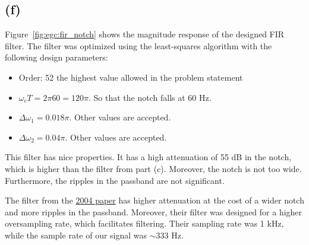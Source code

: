 \documentclass{article}
\begin{document}
\subsection{(f)}

Figure~\ref{fig:egc:fir_notch} shows the magnitude response of the designed FIR filter. The filter was optimized using the least-squares algorithm with the following design parameters:
\begin{itemize}
	\item Order: 52 the highest value allowed in the problem statement
	\item $\omega_cT = 2\pi 60 = 120\pi$. So that the notch falls at 60 Hz.
	\item $\Delta\omega_1 = 0.018\pi$. Other values are accepted.
	\item $\Delta\omega_2 = 0.04\pi$. Other values are accepted.
\end{itemize}
	
This filter has nice properties. It has a high attenuation of 55 dB in the notch, which is higher than the filter from part (c). Moreover, the notch is not too wide. Furthermore, the ripples in the passband are not significant.

The filter from the \href{http://ieeexplore.ieee.org/document/1351410/}{2004 paper} has higher attenuation at the cost of a wider notch and more ripples in the passband. Moreover, their filter was designed for a higher oversampling rate, which facilitates filtering. Their sampling rate was 1 kHz, while the sample rate of our signal was $\sim 333$ Hz.
	
\end{document}
